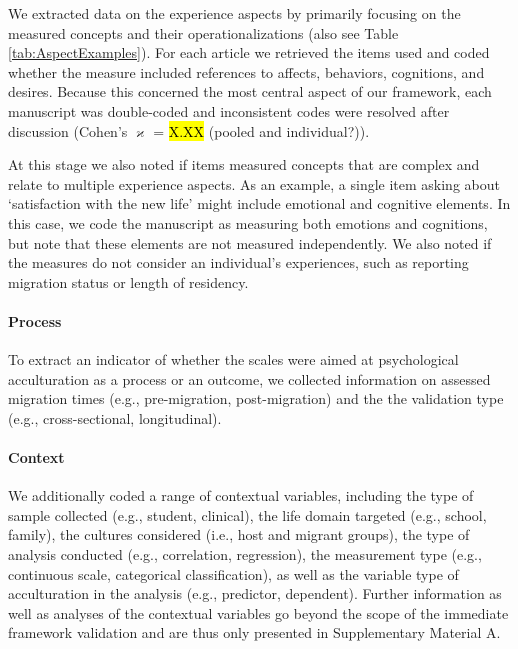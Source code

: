 We extracted data on the experience aspects by primarily focusing on the
measured concepts and their operationalizations (also see Table
\ref{tab:AspectExamples}). For each article we retrieved the items used
and coded whether the measure included references to affects, behaviors,
cognitions, and desires. Because this concerned the most central aspect
of our framework, each manuscript was double-coded and inconsistent
codes were resolved after discussion (Cohen's \(\varkappa\) = \hl{X.XX}
(pooled and individual?)).

At this stage we also noted if items measured concepts that are complex
and relate to multiple experience aspects. As an example, a single item
asking about `satisfaction with the new life' might include emotional
and cognitive elements. In this case, we code the manuscript as
measuring both emotions and cognitions, but note that these elements are
not measured independently. We also noted if the measures do not
consider an individual's experiences, such as reporting migration status
or length of residency.

\paragraph{Process}

To extract an indicator of whether the scales were aimed at
psychological acculturation as a process or an outcome, we collected
information on assessed migration times (e.g., pre-migration,
post-migration) and the the validation type (e.g., cross-sectional,
longitudinal).

\paragraph{Context}

We additionally coded a range of contextual variables, including the
type of sample collected (e.g., student, clinical), the life domain
targeted (e.g., school, family), the cultures considered (i.e., host and
migrant groups), the type of analysis conducted (e.g., correlation,
regression), the measurement type (e.g., continuous scale, categorical
classification), as well as the variable type of acculturation in the
analysis (e.g., predictor, dependent). Further information as well as
analyses of the contextual variables go beyond the scope of the
immediate framework validation and are thus only presented in
Supplementary Material A.



